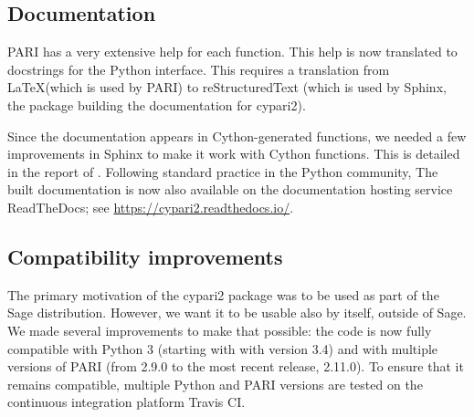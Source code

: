 \documentclass{deliverablereport}
\begin{document}
\subsection{Documentation}

PARI has a very extensive help for each function.
This help is now translated to docstrings for the Python interface.
This requires a translation from \LaTeX (which is used by PARI)
to reStructuredText (which is used by Sphinx,
the package building the documentation for cypari2).

Since the documentation appears in Cython-generated functions,
we needed a few improvements in Sphinx to make it work
with Cython functions.
This is detailed in the report of .
Following standard practice in the Python community,
The built documentation is now also available on the
documentation hosting service ReadTheDocs;
see \url{https://cypari2.readthedocs.io/}.

\subsection{Compatibility improvements}




The primary motivation of the cypari2 package
was to be used as part of the Sage distribution.
However, we want it to be usable also by itself, outside of Sage.
We made several improvements to make that possible:
the code is now fully compatible with Python 3 (starting with with version 3.4)
and with multiple versions of PARI (from 2.9.0 to the most recent release, 2.11.0).
To ensure that it remains compatible, multiple Python and PARI
versions are tested on the continuous integration platform Travis CI.


\end{document}
